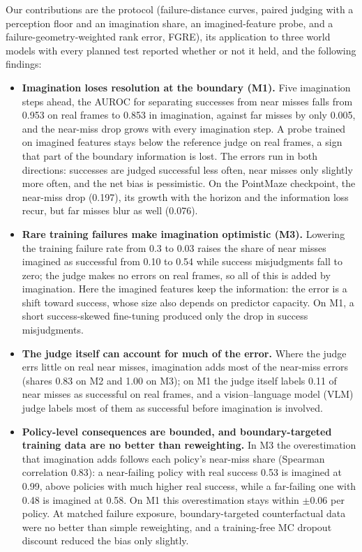 \documentclass[10pt]{article}
\begin{document}
Our contributions are the protocol (failure-distance curves, paired judging with a perception floor and an imagination share, an imagined-feature probe, and a failure-geometry-weighted rank error, FGRE), its application to three world models with every planned test reported whether or not it held, and the following findings:
\begin{itemize}
\item \textbf{Imagination loses resolution at the boundary (M1).} Five imagination steps ahead, the AUROC for separating successes from near misses falls from 0.953 on real frames to 0.853 in imagination, against far misses by only 0.005, and the near-miss drop grows with every imagination step. A probe trained on imagined features stays below the reference judge on real frames, a sign that part of the boundary information is lost. The errors run in both directions: successes are judged successful less often, near misses only slightly more often, and the net bias is pessimistic. On the PointMaze checkpoint, the near-miss drop (0.197), its growth with the horizon and the information loss recur, but far misses blur as well (0.076).
\item \textbf{Rare training failures make imagination optimistic (M3).} Lowering the training failure rate from 0.3 to 0.03 raises the share of near misses imagined as successful from 0.10 to 0.54 while success misjudgments fall to zero; the judge makes no errors on real frames, so all of this is added by imagination. Here the imagined features keep the information: the error is a shift toward success, whose size also depends on predictor capacity. On M1, a short success-skewed fine-tuning produced only the drop in success misjudgments.
\item \textbf{The judge itself can account for much of the error.} Where the judge errs little on real near misses, imagination adds most of the near-miss errors (shares 0.83 on M2 and 1.00 on M3); on M1 the judge itself labels 0.11 of near misses as successful on real frames, and a vision--language model (VLM) judge labels most of them as successful before imagination is involved.
\item \textbf{Policy-level consequences are bounded, and boundary-targeted training data are no better than reweighting.} In M3 the overestimation that imagination adds follows each policy's near-miss share (Spearman correlation 0.83): a near-failing policy with real success 0.53 is imagined at 0.99, above policies with much higher real success, while a far-failing one with 0.48 is imagined at 0.58. On M1 this overestimation stays within $\pm$0.06 per policy. At matched failure exposure, boundary-targeted counterfactual data were no better than simple reweighting, and a training-free MC dropout discount reduced the bias only slightly.
\end{itemize}
\end{document}
